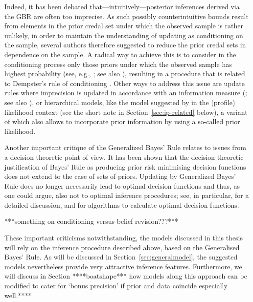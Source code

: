 Indeed, it has been debated that---intuitively---posterior inferences derived via the GBR are often too imprecise.
As such possibly counterintuitive bounds result from elements in the prior credal set under which the observed sample is rather unlikely,
in order to maintain the understanding of updating as conditioning on the sample,
several authors therefore suggested to reduce the prior credal sets in dependence on the sample.
A radical way to achieve this is to consider in the conditioning process only those priors
under which the observed sample has highest probability (see, e.g., \cite{2007:held}; see also \cite{1982:walley}),
resulting in a procedure that is related to Dempster's rule of conditioning \parencite[see, e.g.,][\S 3.2]{itip-other}.
Other ways to address this issue are update rules where imprecision is updated in accordance with an information measure 
(\cite{1993:coolen, 1994:coolen}; see also \cite{1994:coolen::phd}), or hierarchical models,
like the model suggested by \textcite{2008:cattaneo} in the (profile) likelihood context
(see the short note in Section~\ref{sec:ip-related} below),
a variant of which also allows to incorporate prior information by using a so-called prior likelihood.

Another important critique of the Generalized Bayes' Rule relates to issues from a decision theoretic point of view.
It has been shown that the decision theoretic justification of Bayes' Rule
as producing prior risk minimising decision functions does not extend to the case of sets of priors.
Updating by Generalized Bayes' Rule does no longer necessarily lead to optimal decision functions and thus, as one could argue,
also not to optimal inference procedures; see, in particular, \textcite{2003:augustin} for a detailed discussion, 
\textcite{2001:NoubiapSeidel} and \textcite{Augustin5:2004} for algorithms to calculate optimal decision functions.

***something on conditioning versus belief revision???***

These important criticisms notwithstanding, 
the models discussed in this thesis will rely on the inference procedure described above, based on the Generalised Bayes' Rule.
As will be discussed in Section~\ref{sec:generalmodel},
the suggested models nevertheless provide very attractive inference features.
Furthermore, we will discuss in Section ****boatshape***
how models along this approach can be modified to cater for `bonus precision'
if prior and data coincide especially well.****


